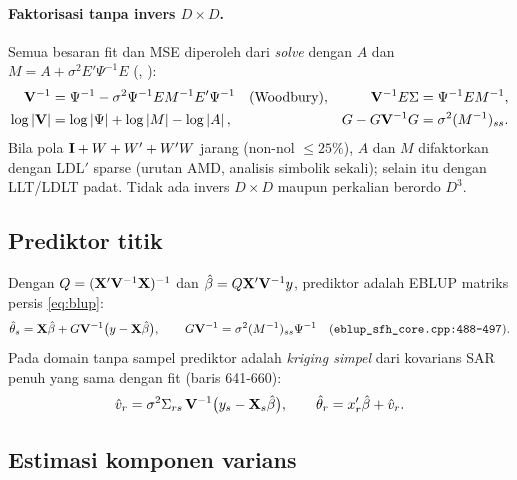 \paragraph{Faktorisasi tanpa invers $D\times D$.} Semua besaran fit dan MSE
diperoleh dari \emph{solve} dengan $A$ dan
$M=A+\sigma^2E'\Psi^{-1}E$ (,
):
\begin{equation}
\begin{aligned}
  \mathbf{V}^{-1}&=\Psi^{-1}-\sigma^2\Psi^{-1}EM^{-1}E'\Psi^{-1}\quad\text{(Woodbury)},&
  \mathbf{V}^{-1}E\Sigma&=\Psi^{-1}EM^{-1},\\
  \log\left|\mathbf{V}\right|&=\log\left|\Psi\right|+\log\left|M\right|-\log\left|A\right|,&
  G-G\mathbf{V}^{-1}G&=\sigma^2(M^{-1})_{ss}.
\end{aligned}
  \label{eq:sfh-engine}
\end{equation}
Bila pola $\mathbf{I}+W+W'+W'W$ jarang (non-nol $\le25\%$), $A$ dan $M$
difaktorkan dengan LDL$'$ sparse  (urutan AMD, analisis simbolik
sekali); selain itu dengan LLT/LDLT padat. Tidak ada invers $D\times D$ maupun
perkalian berordo $D^3$.

\subsection{Prediktor titik}\label{sec:sfh-prediktor}

Dengan $Q=(\mathbf{X}'\mathbf{V}^{-1}\mathbf{X})^{-1}$ dan
$\hat\beta=Q\mathbf{X}'\mathbf{V}^{-1}y$, prediktor adalah EBLUP matriks persis
\eqref{eq:blup}:
\begin{equation}
  \hat\theta_s=\mathbf{X}\hat\beta+G\mathbf{V}^{-1}\bigl(y-\mathbf{X}\hat\beta\bigr),
  \qquad
  G\mathbf{V}^{-1}=\sigma^2(M^{-1})_{ss}\Psi^{-1}
  \quad(\texttt{eblup\_sfh\_core.cpp:488-497}).
  \label{eq:sfh-pred}
\end{equation}
Pada domain tanpa sampel prediktor adalah \emph{kriging simpel} dari kovarians
SAR penuh yang sama dengan fit (baris 641-660):
\begin{equation}
  \hat v_{r}=\sigma^2\Sigma_{rs}\,\mathbf{V}^{-1}\bigl(y_s-\mathbf{X}_s\hat\beta\bigr),
  \qquad
  \hat\theta_{r}=x_{r}'\hat\beta+\hat v_{r}.
  \label{eq:sfh-kriging}
\end{equation}

\subsection{Estimasi komponen varians}\label{sec:sfh-varians}

